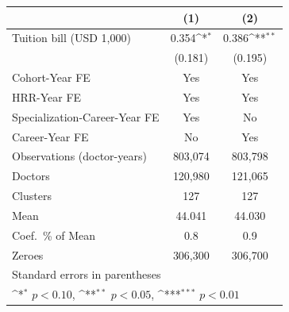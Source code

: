 {
\def\sym#1{\ifmmode^{#1}\else\(^{#1}\)\fi}
\begin{tabular}{l*{2}{c}}
\hline\hline
                    &\multicolumn{1}{c}{(1)}         &\multicolumn{1}{c}{(2)}         \\
\hline
Tuition bill (USD 1,000)&       0.354\sym{*}  &       0.386\sym{**} \\
                    &     (0.181)         &     (0.195)         \\
[1em]
Cohort-Year FE      &         Yes         &         Yes         \\
[1em]
HRR-Year FE         &         Yes         &         Yes         \\
[1em]
Specialization-Career-Year FE&         Yes         &          No         \\
[1em]
Career-Year FE      &          No         &         Yes         \\
\hline
Observations (doctor-years)&     803,074         &     803,798         \\
Doctors             &     120,980         &     121,065         \\
Clusters            &         127         &         127         \\
Mean                &      44.041         &      44.030         \\
Coef.\ \% of Mean   &         0.8         &         0.9         \\
Zeroes              &     306,300         &     306,700         \\
\hline\hline
\multicolumn{3}{l}{\footnotesize Standard errors in parentheses}\\
\multicolumn{3}{l}{\footnotesize \sym{*} \(p<0.10\), \sym{**} \(p<0.05\), \sym{***} \(p<0.01\)}\\
\end{tabular}
}
